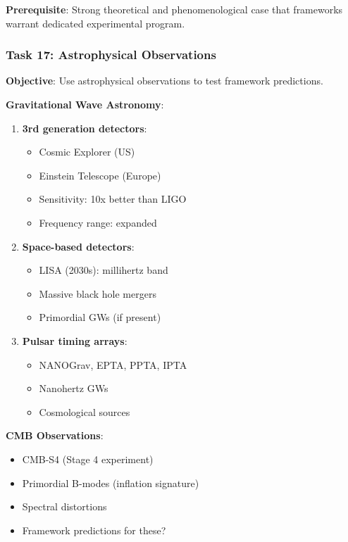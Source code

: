 \textbf{Prerequisite}: Strong theoretical and phenomenological case that frameworks warrant dedicated experimental program.

\subsubsection{Task 17: Astrophysical Observations}

\textbf{Objective}: Use astrophysical observations to test framework predictions.

\textbf{Gravitational Wave Astronomy}:
\begin{enumerate}
    \item \textbf{3rd generation detectors}:
    \begin{itemize}
        \item Cosmic Explorer (US)
        \item Einstein Telescope (Europe)
        \item Sensitivity: 10x better than LIGO
        \item Frequency range: expanded
    \end{itemize}

    \item \textbf{Space-based detectors}:
    \begin{itemize}
        \item LISA (2030s): millihertz band
        \item Massive black hole mergers
        \item Primordial GWs (if present)
    \end{itemize}

    \item \textbf{Pulsar timing arrays}:
    \begin{itemize}
        \item NANOGrav, EPTA, PPTA, IPTA
        \item Nanohertz GWs
        \item Cosmological sources
    \end{itemize}
\end{enumerate}

\textbf{CMB Observations}:
\begin{itemize}
    \item CMB-S4 (Stage 4 experiment)
    \item Primordial B-modes (inflation signature)
    \item Spectral distortions
    \item Framework predictions for these?
\end{itemize}

